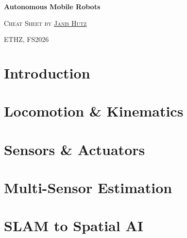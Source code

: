 \documentclass{article}
\begin{document}
\noverticalspacing

\vspace*{0mm}

\begin{center}
    \begin{Large}
        \textbf{Autonomous Mobile Robots}
    \end{Large}

    \textsc{Cheat Sheet by {\color{MidnightBlue}\href{https://janishutz.com}{Janis Hutz}}}

    \textsc{ETHZ, FS2026}
\end{center}


\section{Introduction}




\section{Locomotion \& Kinematics}







% 

\section{Sensors \& Actuators}





% 

\section{Multi-Sensor Estimation}







% 

\section{SLAM to Spatial AI}





% 
\end{document}
